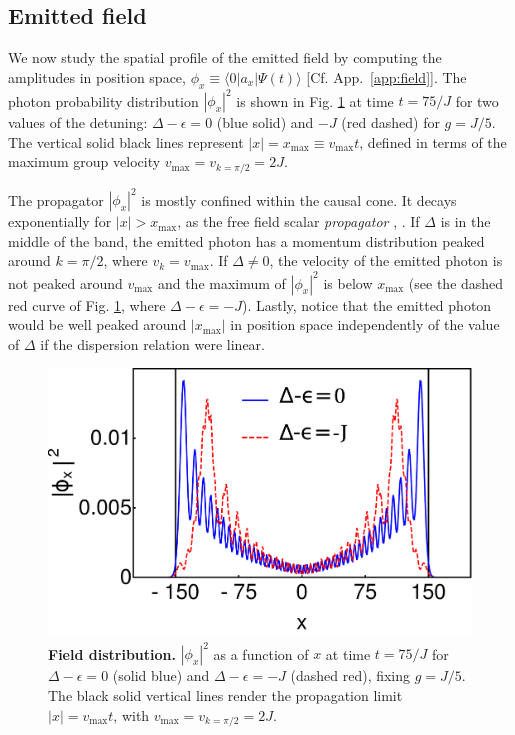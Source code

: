 \documentclass[aps,pra,twocolumn,floatfix,superscriptaddress]{revtex4-1}%
\begin{document}

\subsection{Emitted field}

We now study the spatial profile of the emitted field by computing the amplitudes in position space, $\phi_x\equiv \langle 0|a_x|\Psi(t)\rangle$ [Cf. App.\ \ref{app:field}]. The photon probability distribution $|\phi_x|^2$ is shown in Fig. \ref{fig:w_n} at time $t=75/J$ for two values of the detuning: $\Delta-\epsilon=0$ (blue solid) and $-J$ (red dashed) for $g=J/5$. The vertical solid black lines represent $|x|=x_\text{max}\equiv v_\text{max}t$, defined in terms of the maximum group velocity $v_\text{max}= v_{k=\pi/2}=2J$. 

The propagator $|\phi_x|^2$ is mostly confined within the causal cone. It decays exponentially for $|x|>x_\text{max}$, as the free field scalar {\it propagator} \cite[Sect. 4.5]{Greiner-fq}, \cite[Sect. 2]{Peskin}. If $\Delta$ is in the middle of the band, the emitted photon has a momentum distribution peaked around $k=\pi/2$, where $v_k=v_\text{max}$. {\color{blue}If $\Delta\neq 0$, the velocity of the emitted photon is not peaked around $v_\text{max}$ and the maximum of $|\phi_x|^2$ is below $x_\text{max}$ (see the dashed red curve of Fig. \ref{fig:w_n}, where $\Delta-\epsilon=-J$)}. {\color{blue}Lastly, notice that the emitted photon would be well peaked around $|x_\text{max}|$ in position space independently of the value of $\Delta$ if the dispersion relation were linear.}


\begin{figure}[thb!]
\includegraphics[width=1.0\columnwidth]{wx_g_0_2_Delta_0_-1.pdf}
\caption{{\bf Field distribution.} $|\phi_x|^2$ as a function of $x$ at time $t=75/J$ for $\Delta-\epsilon=0$ (solid blue) and $\Delta-\epsilon=-J$ (dashed red), fixing $g=J/5$. The black solid vertical lines render the propagation limit $|x|=v_\text{max}t$, with $v_\text{max}=v_{k=\pi/2}=2J$.}\label{fig:w_n}
\end{figure}
\end{document}

